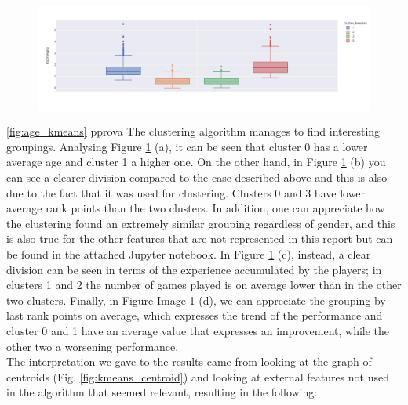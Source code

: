 \begin{figure}[!h]
\begin{minipage}{.45\textwidth}
	\end{minipage}
	\begin{minipage}{.45\textwidth}
		\centering
		\includegraphics[width=\textwidth]{plots/kmeans/kmeans-box-plot-lrponavgrp.png}
	\end{minipage}
	\label{fig:kmeans_distributions}
\end{figure}
\ref{fig:age_kmeans} pprova
The clustering algorithm manages to find interesting groupings. Analysing Figure \ref{fig:kmeans_distributions} (a), it can be seen that cluster 0 has a lower average age and cluster 1 a higher one. 
On the other hand, in Figure \ref{fig:kmeans_distributions} (b) you can see a clearer division compared to the case described above and this is also due to the fact that it was used for clustering. Clusters 0 and 3 have lower average rank points than the two clusters. In addition, one can appreciate how the clustering found an extremely similar grouping regardless of gender, and this is also true for the other features that are not represented in this report but can be found in the attached Jupyter notebook.
In Figure \ref{fig:kmeans_distributions} (c), instead, a clear division can be seen in terms of the experience accumulated by the players; in clusters 1 and 2 the number of games played is on average lower than in the other two clusters. 
Finally, in Figure Image \ref{fig:kmeans_distributions} (d), we can appreciate the grouping by last rank points on average, which expresses the trend of the performance and cluster 0 and 1 have an average value that expresses an improvement, while the other two a worsening performance.
\\
The interpretation we gave to the results came from looking at the graph of centroids (Fig. \ref{fig:kmeans_centroid}) and looking at external features not used in the algorithm that seemed relevant, resulting in the following:
